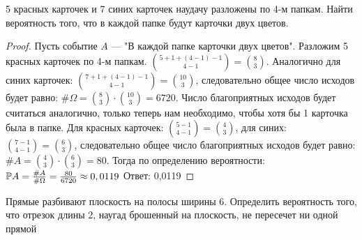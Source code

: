 
\renewcommand*{\proofname}{Решение}

\begin{problem}
        5 красных карточек и 7 синих карточек наудачу разложены по 4-м папкам. Найти вероятность того, что в каждой папке будут карточки двух цветов.
\end{problem}

\begin{proof}
    Пусть событие $A$ --- "В каждой папке карточки двух цветов". Разложим 5 красных карточек по 4-м папкам. ${{5 + 1 + (4 - 1) - 1} \choose {4 - 1}} = {8 \choose 3}$. Аналогично для синих карточек: ${{7 + 1 + (4 - 1) - 1} \choose {4 - 1}} = {10 \choose 3}$, следовательно общее число исходов будет равно: $\# \Omega = {8 \choose 3} \cdot {10 \choose 3} = 6720.$ Число благоприятных исходов будет считаться аналогично, только теперь нам необходимо, чтобы хотя бы 1 карточка была в папке. Для красных карточек: ${{5 - 1} \choose {4 - 1}} = {4 \choose 3}$, для синих: ${{7 - 1} \choose {4 - 1}} = {6 \choose 3}$, следовательно общее число благоприятных исходов будет равно: $\#A = {4 \choose 3} \cdot {6 \choose 3} = 80.$ Тогда по определению вероятности:\newline
    $\mathbb{P}A = \frac{\#A}{\#\Omega} = \frac{80}{6720} \approx 0,0119\newline$
    \newline
Ответ: 0,0119
\end{proof}

\begin{problem}
	Прямые разбивают плоскость на полосы ширины 6. Определить вероятность того, что отрезок длины 2, наугад брошенный на плоскость, не пересечет ни одной прямой
\end{problem}

